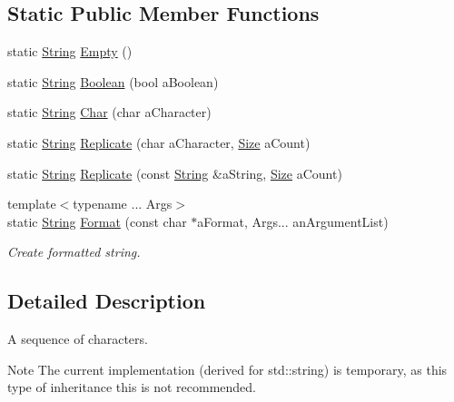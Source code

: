 \subsection*{Static Public Member Functions}
\begin{DoxyCompactItemize}
\item 
static \hyperlink{classostk_1_1core_1_1types_1_1_string}{String} \hyperlink{classostk_1_1core_1_1types_1_1_string_a66ebb081c6ece7e0140e355d0c6eaa23}{Empty} ()
\item 
static \hyperlink{classostk_1_1core_1_1types_1_1_string}{String} \hyperlink{classostk_1_1core_1_1types_1_1_string_a27a7c19665dd681777e092eff4c49495}{Boolean} (bool a\+Boolean)
\item 
static \hyperlink{classostk_1_1core_1_1types_1_1_string}{String} \hyperlink{classostk_1_1core_1_1types_1_1_string_a0aa76a29c15c07e068ecb1606f261712}{Char} (char a\+Character)
\item 
static \hyperlink{classostk_1_1core_1_1types_1_1_string}{String} \hyperlink{classostk_1_1core_1_1types_1_1_string_ace870e534ddbdfc01a56b849f7520c8c}{Replicate} (char a\+Character, \hyperlink{namespaceostk_1_1core_1_1types_acf68f214a245e35a7c1994c84dc56746}{Size} a\+Count)
\item 
static \hyperlink{classostk_1_1core_1_1types_1_1_string}{String} \hyperlink{classostk_1_1core_1_1types_1_1_string_afb3e7dae9340e7494ec875b6f65312d2}{Replicate} (const \hyperlink{classostk_1_1core_1_1types_1_1_string}{String} \&a\+String, \hyperlink{namespaceostk_1_1core_1_1types_acf68f214a245e35a7c1994c84dc56746}{Size} a\+Count)
\item 
{\footnotesize template$<$typename ... Args$>$ }\\static \hyperlink{classostk_1_1core_1_1types_1_1_string}{String} \hyperlink{classostk_1_1core_1_1types_1_1_string_afb00429ca478a722cd38904f52aa6f26}{Format} (const char $\ast$a\+Format, Args... an\+Argument\+List)
\begin{DoxyCompactList}\small\item\em Create formatted string. \end{DoxyCompactList}\end{DoxyCompactItemize}


\subsection{Detailed Description}
A sequence of characters. 

\begin{DoxyNote}{Note}
The current implementation (derived for std\+::string) is temporary, as this type of inheritance this is not recommended. 
\end{DoxyNote}


